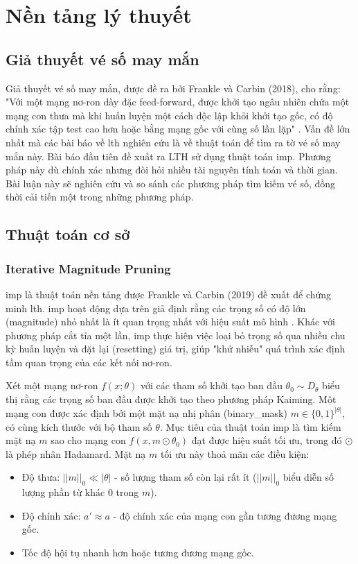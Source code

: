 \chapter{Nền tảng lý thuyết}
\newtheorem{definition}{Định nghĩa}[chapter]
\newtheorem{theorem}{Định lý}[chapter]
\section{Giả thuyết vé số may mắn}
Giả thuyết vé số may mắn, được đề ra bởi Frankle và Carbin (2018), cho rằng: "Với một mạng nơ-ron dày đặc feed-forward, được khởi tạo ngâu nhiên chứa một mạng con thưa mà khi huấn luyện một cách độc lập khỏi khởi tạo gốc, có độ chính xác tập test cao hơn hoặc bằng mạng gốc với cùng số lần lặp" \cite{imp}. Vấn đề lớn nhất mà các bài báo về \gls{lth} nghiên cứu là về thuật toán để tìm ra tờ vé số may mắn này. Bài báo đầu tiên đề xuất ra LTH sử dụng thuật toán \gls{imp}. Phương pháp này dù chính xác nhưng đòi hỏi nhiều tài nguyên tính toán và thời gian. Bài luận này sẽ nghiên cứu và so sánh các phương pháp tìm kiếm vé số, đồng thời cải tiến một trong những phương pháp.
\section{Thuật toán cơ sở}
\subsection{Iterative Magnitude Pruning}
\gls{imp} là thuật toán nền tảng được Frankle và Carbin (2019) đề xuất để chứng minh \gls{lth}. \gls{imp} hoạt động dựa trên giả định rằng các trọng số có độ lớn (magnitude) nhỏ nhất là ít quan trọng nhất với hiệu suất mô hình \cite[p~.1]{fisher}. Khác với phương pháp cắt tỉa một lần, \gls{imp} thực hiện việc loại bỏ trọng số qua nhiều chu kỳ huấn luyện và đặt lại (resetting) giá trị, giúp "khử nhiễu" quá trình xác định tầm quan trọng của các kết nối nơ-ron.

Xét một mạng nơ-ron $f(x;\theta)$ với các tham số khởi tạo ban đầu $\theta_0 \sim D_\theta$ biểu thị rằng các trọng số ban đầu được khởi tạo theo phương pháp Kaiming. Một mạng con được xác định bởi một mặt nạ nhị phân (\gls{binary_mask}) $m \in \{0, 1\}^{|\theta|}$, có cùng kích thước với bộ tham số $\theta$.
Mục tiêu của thuật toán \gls{imp} là tìm kiếm mặt nạ $m$ sao cho mạng con $f(x, m \odot \theta_0)$ đạt được hiệu suất tối ưu, trong đó $\odot$ là phép nhân Hadamard. Mặt nạ $m$ tối ưu này thoả mãn các điều kiện:
\begin{itemize}
    \item  Độ thưa: $||m||_0 \ll |\theta|$ - số lượng tham số còn lại rất ít ($||m||_0$ biểu diễn số lượng phần từ khác 0 trong $m$).
    \item Độ chính xác: $a' \approx a$ - độ chính xác của mạng con gần tương đương mạng gốc.
    \item Tốc độ hội tụ nhanh hơn hoặc tương đương mạng gốc.
\end{itemize}

